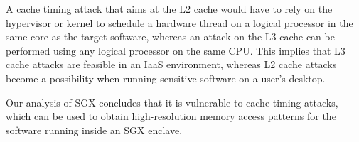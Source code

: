 
\begin{table}[hbt]
  \caption{
    Approximate sizes and access times for each level in the memory
    hierarchy of an Intel processor, from \cite{intel2010perfanalysis}. Memory
    sizes and access times differ by orders of magnitude across the different
    levels of the hierarchy. This table does not cover multi-processor systems.
  }
  \label{fig:cache_timings}
\end{table}

A cache timing attack that aims at the L2 cache would have to rely on the
hypervisor or kernel to schedule a hardware thread on a logical processor in
the same core as the target software, whereas an attack on the L3 cache can be
performed using any logical processor on the same CPU. This implies that L3
cache attacks are feasible in an IaaS environment, whereas L2 cache attacks
become a possibility when running sensitive software on a user's desktop.

Our analysis of SGX concludes that it is vulnerable to cache timing attacks,
which can be used to obtain high-resolution memory access patterns for the
software running inside an SGX enclave.
